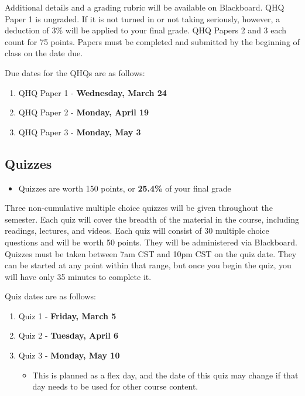 \documentclass[
]{book}
\providecommand{\tightlist}{%
  \setlength{\itemsep}{0pt}\setlength{\parskip}{0pt}}
\newenvironment{rmdblock}[1]
  {\begin{shaded*}
  \begin{itemize}
  \renewcommand{\labelitemi}{
    \raisebox{-.7\height}[0pt][0pt]{
      {\setkeys{Gin}{width=3em,keepaspectratio}\texttt{[image: images/\#1]}}
    }
  }
  \item
  }
  {
  \end{itemize}
  \end{shaded*}
  }
\newenvironment{rmdtip}
  {\begin{rmdblock}{tip}}
  {\end{rmdblock}}
\begin{document}
Additional details and a grading rubric will be available on Blackboard. QHQ Paper 1 is ungraded. If it is not turned in or not taking seriously, however, a deduction of 3\% will be applied to your final grade. QHQ Papers 2 and 3 each count for 75 points. Papers must be completed and submitted by the beginning of class on the date due.

Due dates for the QHQs are as follows:

\begin{enumerate}
\def\labelenumi{\arabic{enumi}.}
\tightlist
\item
  QHQ Paper 1 - \textbf{Wednesday, March 24}
\item
  QHQ Paper 2 - \textbf{Monday, April 19}
\item
  QHQ Paper 3 - \textbf{Monday, May 3}
\end{enumerate}

\hypertarget{quizzes}{%
\subsection{Quizzes}\label{quizzes}}

\begin{rmdtip}
Quizzes are worth 150 points, or \textbf{25.4\%} of your final grade
\end{rmdtip}

Three non-cumulative multiple choice quizzes will be given throughout the semester. Each quiz will cover the breadth of the material in the course, including readings, lectures, and videos. Each quiz will consist of 30 multiple choice questions and will be worth 50 points. They will be administered via Blackboard. Quizzes must be taken between 7am CST and 10pm CST on the quiz date. They can be started at any point within that range, but once you begin the quiz, you will have only 35 minutes to complete it.

Quiz dates are as follows:

\begin{enumerate}
\def\labelenumi{\arabic{enumi}.}
\tightlist
\item
  Quiz 1 - \textbf{Friday, March 5}
\item
  Quiz 2 - \textbf{Tuesday, April 6}
\item
  Quiz 3 - \textbf{Monday, May 10}

  \begin{itemize}
  \tightlist
  \item
    This is planned as a flex day, and the date of this quiz may change if that day needs to be used for other course content.
  \end{itemize}
\end{enumerate}
\end{document}
